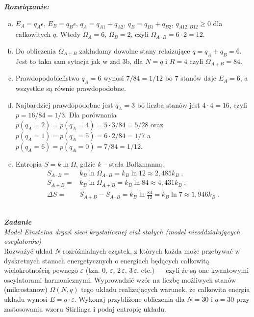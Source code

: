\documentclass[11pt,a4paper]{article}
\newcounter{zadanie}\newcommand{\zadanie}[1][]{\addtocounter{zadanie}{1} ~\\  {\bf \emph{Zadanie \arabic{zadanie} #1 }} \\}
\begin{document}
{\bf \em Rozwiązanie:} 
\begin{enumerate}[a)]
    \item $E_A=q_A\epsilon$, $E_B=q_B\epsilon$, $q_A=q_{A1}+q_{A2}$, $q_B=q_{B1}+q_{B2}$,  $q_{A12,B12}\geq 0$ dla całkowitych $q$. Wtedy $\Omega_A=6$, $\Omega_B=2$, czyli $\Omega_{A \cdot B}=6\cdot 2=12$.
    \item Do obliczenia $\Omega_{A+B}$ zakładamy dowolne stany relaizujące $q=q_A+q_B=6$. Jest to taka sam sytacja jak w zad 3b, dla $N=q$ i $R=4$ czyli $\Omega_{A+B}=84$.
    \item Prawdopodobieństwo $q_A=6$ wynosi $7/84=1/12$ bo $7$ stanów daje $E_A=6$, a wszystkie są równie prawdopodobne.
    \item Najbardziej prawdopodobne jest $q_A=3$ bo liczba stanów jest $4\cdot 4=16$, czyli $p=16/84=1/3$. Dla porównania $p(q_A=2)=p(q_A=4)=5\cdot 3/84=5/28$ oraz $p(q_A=1)=p(q_A=5)=6\cdot 2/84=1/7$ a $p(q_A=6)=p(q_A=0)=7/84=1/12$. 
    \item Entropia $S=k\ln\Omega$, gdzie $k$ -- stała Boltzmanna.
    \begin{align*}
    S_{A\cdot B} =& k_B \ln \Omega_{A \cdot B} = k_B \ln 12 \approx 2,485 k_B\; ,\\
    S_{A + B} =& k_B \ln \Omega_{A + B} = k_B \ln 84 \approx 4,431 k_B\;, \\
    \Delta S =& S_{A + B} - S_{A\cdot B} = k_B \ln \frac{84}{12} = k_B \ln 7 \approx 1,946 k_B \;.
    \end{align*}
\end{enumerate}
 


\zadanie
{\em Model Einsteina drgań sieci krystalicznej ciał stałych  (model nieoddziałujących oscylatorów)}\\
Rozważyć układ $N$ rozróżnialnych cząstek, z których każda może przebywać w dyskretnych stanach energetycznych o energiach będących całkowitą wielokrotnością pewnego $\varepsilon$ (tzn. $0,\,\varepsilon,\,2\,\varepsilon,\,3\,\varepsilon$, etc.) --- czyli że są one kwantowymi oscylatorami harmonicznymi. Wyprowadzić wzór na liczbę możliwych stanów (mikrostanow) $\Omega (N, q)$ tego układu realizujących warunek, że całkowita energia układu wynosi $E = q\cdot\varepsilon$. 
Wykonaj przybliżone obliczenia dla $N = 30$ i $q = 30$ przy zastosowaniu wzoru Stirlinga i podaj entropię układu.
\vspace{5mm}
\end{document}
